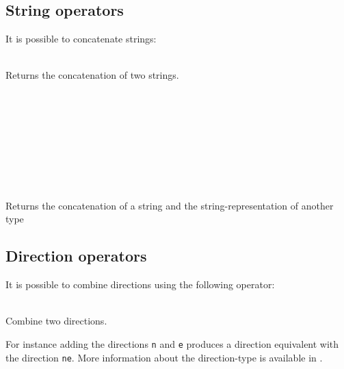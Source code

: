 \subsection{String operators}

It is possible to concatenate strings:

\begin{dlist}
  \item {} \\
    Returns the concatenation of two strings.
  \item {} \\
    \\
    \\
    \\
    \\
    \\
    \\
    \\
    Returns the concatenation of a string and the string-representation of another type
\end{dlist}

\subsection{Direction operators}

It is possible to combine directions using the following operator:

\begin{dlist}
  \item {} \\
    Combine two directions.
\end{dlist}

For instance adding the directions \texttt{n} and \texttt{e} produces a direction
equivalent with the direction \texttt{ne}. More information about the direction-type
is available in .


